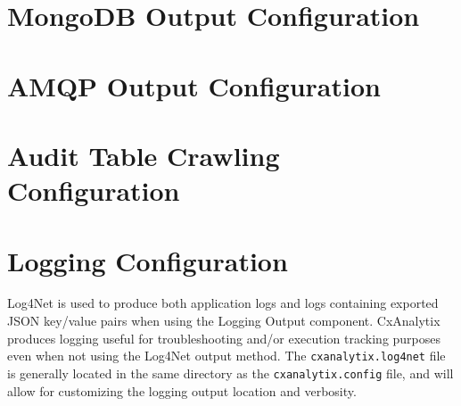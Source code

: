 \section{MongoDB Output Configuration}\label{sec:mongo_config}
\section{AMQP Output Configuration}\label{sec:amqp_config}

\section{Audit Table Crawling Configuration}


\section{Logging Configuration}

Log4Net is used to produce both application logs and logs containing exported JSON key/value pairs when using the Logging Output component. 
CxAnalytix produces logging useful for troubleshooting and/or execution tracking purposes even when not using the Log4Net output method.  The 
\texttt{cxanalytix.log4net} file is generally located in the same directory as the \texttt{cxanalytix.config} file, and will allow for
customizing the logging output location and verbosity.